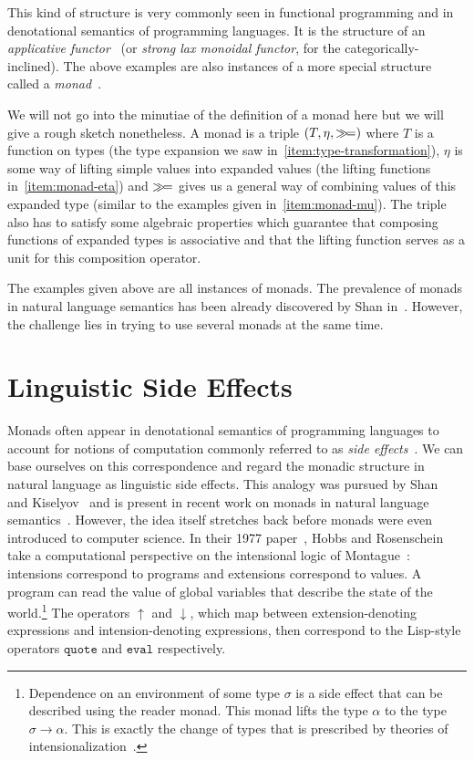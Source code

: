 This kind of structure is very commonly seen in functional programming and
in denotational semantics of programming languages. It is the structure of
an \emph{applicative functor}~\cite{mcbride2008applicative} (or
\emph{strong lax monoidal functor}, for the categorically-inclined). The
above examples are also instances of a more special structure called a
\emph{monad}~\cite{moggi1991notions}.

We will not go into the minutiae of the definition of a monad here but we
will give a rough sketch nonetheless. A monad is a triple
$(T, \eta, \mathbin{\gg\!=})$ where $T$ is a function on types (the type expansion
we saw in~\ref{item:type-transformation}), $\eta$ is some way of lifting
simple values into expanded values (the lifting functions
in~\ref{item:monad-eta}) and $\mathbin{\gg\!=}$ gives us a general way of combining
values of this expanded type (similar to the examples given
in~\ref{item:monad-mu}). The triple also has to satisfy some algebraic
properties which guarantee that composing functions of expanded types is
associative and that the lifting function serves as a unit for this
composition operator.

The examples given above are all instances of monads. The prevalence of
monads in natural language semantics has been already discovered by Shan
in~\cite{shan2002monads}. However, the challenge lies in trying to use
several monads at the same time.


\section*{Linguistic Side Effects}

Monads often appear in denotational semantics of programming languages to
account for notions of computation commonly referred to as \emph{side
  effects}~\cite{moggi1991notions}. We can base ourselves on this
correspondence and regard the monadic structure in natural language as
linguistic side effects. This analogy was pursued by
Shan~\cite{shan2005linguistic,shan2005thesis} and
Kiselyov~\cite{kiselyov2008call} and is present in recent work on monads in
natural language
semantics~\cite{giorgolo2012monads,charlow2014semantics}. However, the idea
itself stretches back before monads were even introduced to computer
science. In their 1977 paper~\cite{hobbs1977making}, Hobbs and Rosenschein
take a computational perspective on the intensional logic of
Montague~\cite{montague1973proper}: intensions correspond to programs and
extensions correspond to values. A program can read the value of global
variables that describe the state of the world.\footnote{Dependence on an
  environment of some type $\sigma$ is a side effect that can be described
  using the reader monad. This monad lifts the type $\alpha$ to the type
  $\sigma \to \alpha$. This is exactly the change of types that is
  prescribed by theories of
  intensionalization~\cite{ben2007semantics,de2013note}.} The operators
$\uparrow$ and $\downarrow$, which map between extension-denoting
expressions and intension-denoting expressions, then correspond to the
Lisp-style operators $\texttt{quote}$ and $\texttt{eval}$ respectively.

